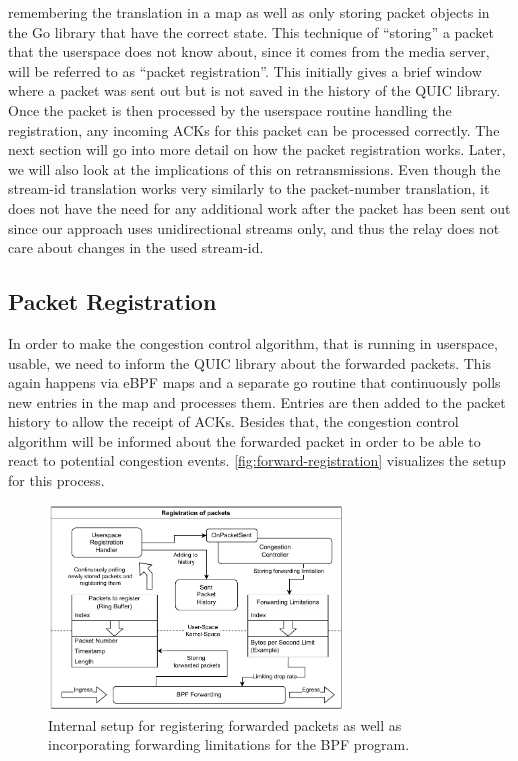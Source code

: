 remembering the translation in a map as well as only storing packet objects in the 
Go library that have the correct state.
This technique of ``storing'' a packet that the userspace does not know
about, since it comes from the media server, will be referred to as ``packet registration''.
This initially gives a brief window where a packet was sent out but is not saved in the history
of the QUIC library.
Once the packet is then processed by the userspace routine handling the 
registration, any incoming ACKs for this packet can be processed correctly.
The next section will go into more detail on how the packet registration works.
Later, we will also look at the implications of this on retransmissions.
Even though the stream-id translation works very similarly to the packet-number translation, it 
does not have the need for any additional work after the packet has been sent out since our 
approach uses unidirectional streams only, and thus the relay does not care about changes in 
the used stream-id. %

\subsection{Packet Registration}
In order to make the congestion control algorithm, that is running in userspace,
usable, we need to inform the QUIC library about the forwarded packets.
This again happens via eBPF maps and a separate go routine that continuously
polls new entries in the map and processes them.
Entries are then added to the packet history to allow the receipt of ACKs.
Besides that, the congestion control algorithm will be informed about the
forwarded packet in order to be able to react to potential congestion events.
\autoref{fig:forward-registration} visualizes the setup for this process.
\vspace{0.5cm}
\begin{figure}[H]
    \centering
    \includegraphics[width=0.7\textwidth]{figures/03_fast_relays/forward-registration.drawio.pdf}
    \caption[Packet registration schematic]{Internal setup for registering forwarded packets as well as incorporating forwarding
    limitations for the BPF program.}\label{fig:forward-registration}
\end{figure}

